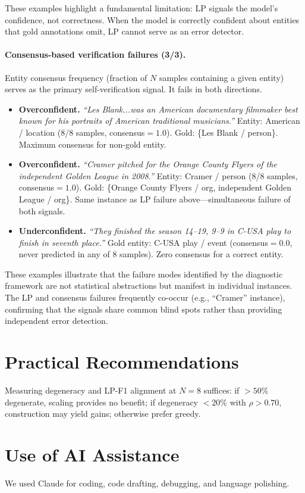 \noindent These examples highlight a fundamental limitation: LP signals the model's confidence, not correctness. When the model is correctly confident about entities that gold annotations omit, LP cannot serve as an error detector.

\paragraph{Consensus-based verification failures (3/3).}
Entity consensus frequency (fraction of $N$ samples containing a given entity) serves as the primary self-verification signal. It fails in both directions.

\begin{itemize}[nosep,leftmargin=*]
\item \textbf{Overconfident.} \textit{``Les Blank...was an American documentary filmmaker best known for his portraits of American traditional musicians.''} Entity: American / location (8/8 samples, consensus${=}1.0$). Gold: \{Les Blank / person\}. Maximum consensus for non-gold entity.

\item \textbf{Overconfident.} \textit{``Cramer pitched for the Orange County Flyers of the independent Golden League in 2008.''} Entity: Cramer / person (8/8 samples, consensus${=}1.0$). Gold: \{Orange County Flyers / org, independent Golden League / org\}. Same instance as LP failure above---simultaneous failure of both signals.

\item \textbf{Underconfident.} \textit{``They finished the season 14--19, 9--9 in C-USA play to finish in seventh place.''} Gold entity: C-USA play / event (consensus${=}0.0$, never predicted in any of 8 samples). Zero consensus for a correct entity.
\end{itemize}

\noindent These examples illustrate that the failure modes identified by the diagnostic framework are not statistical abstractions but manifest in individual instances. The LP and consensus failures frequently co-occur (e.g., ``Cramer'' instance), confirming that the signals share common blind spots rather than providing independent error detection.

\section{Practical Recommendations}\label{app:recommendations}

Measuring degeneracy and LP-F1 alignment at $N{=}8$ suffices: if ${>}50$\% degenerate, scaling provides no benefit; if degeneracy ${<}20$\% with $\rho{>}0.70$, construction may yield gains; otherwise prefer greedy.

\section{Use of AI Assistance}

We used Claude for coding, code drafting, debugging, and language polishing.

